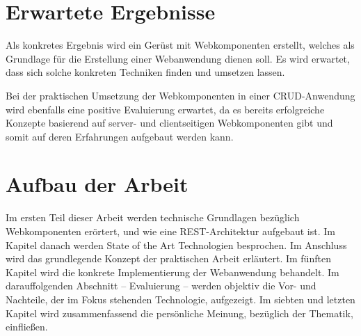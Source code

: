\section{Erwartete Ergebnisse}

Als konkretes Ergebnis wird ein Gerüst mit Webkomponenten erstellt, welches als Grundlage für die Erstellung einer Webanwendung dienen soll. Es wird erwartet, dass sich solche konkreten Techniken finden und umsetzen lassen.

Bei der praktischen Umsetzung der Webkomponenten in einer CRUD-Anwendung wird ebenfalls eine positive Evaluierung erwartet, da es bereits erfolgreiche Konzepte basierend auf server- und clientseitigen Webkomponenten gibt und somit auf deren Erfahrungen aufgebaut werden kann.

\section{Aufbau der Arbeit}
Im ersten Teil dieser Arbeit werden technische Grundlagen bezüglich Webkomponenten erörtert, und wie eine REST-Architektur aufgebaut ist. Im Kapitel danach werden State of the Art Technologien besprochen. Im Anschluss wird das grundlegende Konzept der praktischen Arbeit erläutert. Im fünften Kapitel wird die konkrete Implementierung der Webanwendung behandelt. Im darauffolgenden Abschnitt -- Evaluierung -- werden objektiv die Vor- und Nachteile, der im Fokus stehenden Technologie, aufgezeigt. Im siebten und letzten Kapitel wird  zusammenfassend die persönliche Meinung, bezüglich der Thematik, einfließen. 